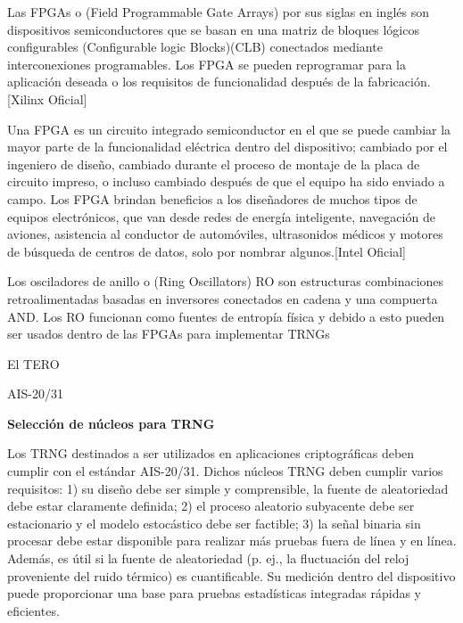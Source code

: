 		
			Las FPGAs o (Field Programmable Gate Arrays) por sus siglas en inglés son dispositivos semiconductores que se basan en una matriz de bloques lógicos configurables (Configurable logic Blocks)(CLB) conectados mediante interconexiones programables. Los FPGA se pueden reprogramar para la aplicación deseada o los requisitos de funcionalidad después de la fabricación. [Xilinx Oficial]
			
			Una FPGA es un circuito integrado semiconductor en el que se puede cambiar la mayor parte de la funcionalidad eléctrica dentro del dispositivo; cambiado por el ingeniero de diseño, cambiado durante el proceso de montaje de la placa de circuito impreso, o incluso cambiado después de que el equipo ha sido enviado a campo. Los FPGA brindan beneficios a los diseñadores de muchos tipos de equipos electrónicos, que van desde redes de energía inteligente, navegación de aviones, asistencia al conductor de automóviles, ultrasonidos médicos y motores de búsqueda de centros de datos, solo por nombrar algunos.[Intel Oficial]

			
			Los osciladores de anillo o (Ring Oscillators) RO	 son estructuras combinaciones retroalimentadas basadas en inversores conectados en cadena y una compuerta AND. Los RO funcionan como fuentes de entropía física  y debido a esto pueden ser usados dentro de las FPGAs para implementar TRNGs \cite{Choi2021}
			
			El TERO \cite{Petura2016} \cite{Varchola2010} \cite{Bernard2018} \cite{Haddad2015}
			
			

						
			
			
			AIS-20/31
			
			
			\textbf{Selección de núcleos para TRNG}
			
			Los TRNG destinados a ser utilizados en aplicaciones criptográficas deben cumplir con el estándar AIS-20/31. Dichos núcleos TRNG deben cumplir varios requisitos: 1) su diseño debe ser simple y comprensible, la fuente de aleatoriedad debe estar claramente definida; 2) el proceso aleatorio subyacente debe ser estacionario y el modelo estocástico debe ser factible; 3) la señal binaria sin procesar debe estar disponible para realizar más pruebas fuera de línea y en línea. Además, es útil si la fuente de aleatoriedad (p. ej., la fluctuación del reloj proveniente del ruido térmico) es cuantificable. Su medición dentro del dispositivo puede proporcionar una base para pruebas estadísticas integradas rápidas y eficientes.
			
